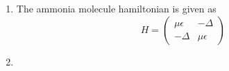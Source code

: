 \begin{sol}
    \begin{enumerate}[label=\textbf{(\alph*)}]
        \item The ammonia molecule hamiltonian is given as
              \begin{equation}
                  H=\begin{pmatrix}
                      \mu\epsilon & -\Delta     \\
                      -\Delta     & \mu\epsilon
                  \end{pmatrix}
              \end{equation}

        \item

    \end{enumerate}
\end{sol}